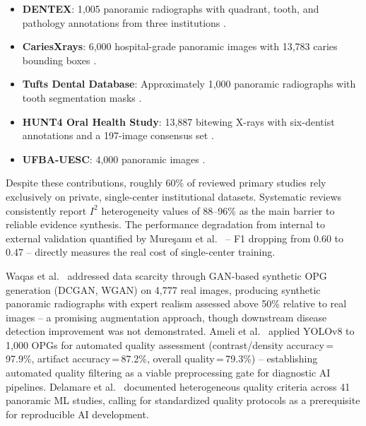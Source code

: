 \documentclass[conference]{IEEEtran}
\begin{document}
\begin{itemize}
  \item \textbf{DENTEX}: 1,005 panoramic radiographs with quadrant,
        tooth, and pathology annotations from three institutions
        \cite{nassiri2025yolo,vannistelrooij2024combining,bizjak2024advancing}.
  \item \textbf{CariesXrays}: 6,000 hospital-grade panoramic images
        with 13,783 caries bounding boxes \cite{chen2024cariesxrays}.
  \item \textbf{Tufts Dental Database}: Approximately 1,000 panoramic
        radiographs with tooth segmentation masks
        \cite{cerda2024determining,kim2024unsupervised,zhang2025reliable,yaswanth2025automated}.
  \item \textbf{HUNT4 Oral Health Study}: 13,887 bitewing X-rays with
        six-dentist annotations and a 197-image consensus set
        \cite{perez2024ai}.
  \item \textbf{UFBA-UESC}: 4,000 panoramic images
        \cite{asadi2024detection}.
\end{itemize}

Despite these contributions, roughly 60\% of reviewed primary
studies rely exclusively on private, single-center institutional
datasets. Systematic reviews
\cite{iacob2025automated,albano2024artificial,luke2025accuracy,bonfanti2025deep,khubrani2025detection}
consistently report $I^2$ heterogeneity values of 88--96\% as the main barrier to reliable evidence synthesis. The performance degradation from internal to external validation quantified by
Mure\c{s}anu et al.~\cite{muresanu2024automating} -- F1 dropping from
0.60 to 0.47 -- directly measures the real cost of single-center
training.

Waqas et al.~\cite{waqas2025synthetic} addressed data scarcity through
GAN-based synthetic OPG generation (DCGAN, WGAN) on 4,777 real images,
producing synthetic panoramic radiographs with expert realism assessed
above 50\% relative to real images -- a promising augmentation approach,
though downstream disease detection improvement was not demonstrated.
Ameli et al.~\cite{ameli2025automated} applied YOLOv8 to 1,000 OPGs for
automated quality assessment (contrast/density accuracy\,=\,97.9\%,
artifact accuracy\,=\,87.2\%, overall quality\,=\,79.3\%) --
establishing automated quality filtering as a viable preprocessing gate
for diagnostic AI pipelines. Delamare et al.~\cite{delamare2024panoramic}
documented heterogeneous quality criteria across 41 panoramic ML
studies, calling for standardized quality protocols as a prerequisite for
reproducible AI development.
\end{document}
